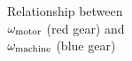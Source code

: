 \documentclass[12pt]{article}
\begin{document}
\begin{landscape}
\begin{minipage}{0.5\textheight}
\begin{center}
	\end{center}
\end{minipage}
\begin{minipage}{0.5\textheight}
	\begin{center}
		\large
		Relationship between \\ $\omega_{\rm{motor}}$ (red gear) and \\$\omega_{\rm{machine}}$ (blue gear)
		
		\vspace{1.5in}
		
		\underline{\hspace{3in}}
		
	\end{center}
\end{minipage}
\end{landscape}

\vspace{2in}
\end{document}
